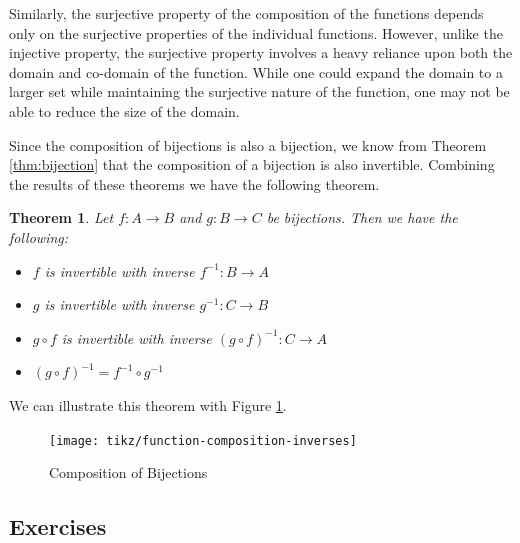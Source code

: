 \documentclass[
]{book}
\newtheorem{theorem}{Theorem}[chapter]
\theoremstyle{definition}
\theoremstyle{definition}
\theoremstyle{definition}
\theoremstyle{definition}
\theoremstyle{remark}
\begin{document}
Similarly, the surjective property of the composition of the functions depends only on the surjective properties of the individual functions. However, unlike the injective property, the surjective property involves a heavy reliance upon both the domain and co-domain of the function. While one could expand the domain to a larger set while maintaining the surjective nature of the function, one may not be able to reduce the size of the domain.

Since the composition of bijections is also a bijection, we know from Theorem \ref{thm:bijection} that the composition of a bijection is also invertible. Combining the results of these theorems we have the following theorem.

\begin{theorem}

Let \(f:A\rightarrow B\) and \(g:B\rightarrow C\) be bijections. Then we have the following:

\begin{itemize}
\item
  \(f\) is invertible with inverse \(f^{-1}:B\rightarrow A\)
\item
  \(g\) is invertible with inverse \(g^{-1}:C\rightarrow B\)
\item
  \(g\circ f\) is invertible with inverse \((g\circ f)^{-1}:C\rightarrow A\)
\item
  \((g\circ f)^{-1} = f^{-1} \circ g^{-1}\)
\end{itemize}

\end{theorem}

We can illustrate this theorem with Figure \ref{fig:composition-bijections}.

\begin{figure}

{\centering \texttt{[image: tikz/function-composition-inverses]} 

}

\caption{Composition of Bijections}\label{fig:composition-bijections}
\end{figure}

\hypertarget{exercises-18}{%
\subsection{Exercises}\label{exercises-18}}
\end{document}

